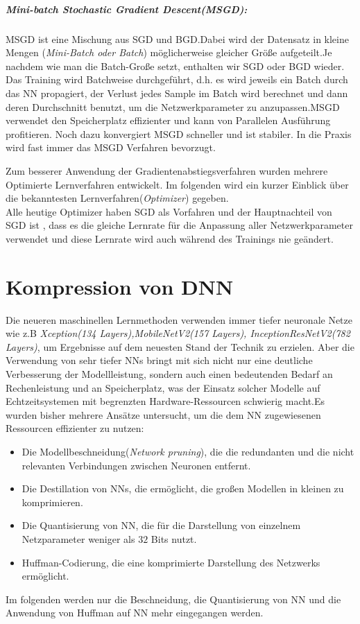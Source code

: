 \documentclass[12pt,a4paper]{scrartcl}
\numberwithin{equation}{section}
\begin{document}
\subparagraph{Mini-batch Stochastic Gradient Descent(MSGD): }
MSGD ist eine Mischung aus SGD und BGD.Dabei wird der Datensatz in kleine Mengen (\textit{Mini-Batch oder Batch}) möglicherweise gleicher Größe aufgeteilt.Je nachdem wie man die Batch-Große setzt, enthalten wir SGD oder BGD wieder. Das Training wird Batchweise durchgeführt, d.h. es wird jeweils ein Batch durch das \ac{NN} propagiert, der Verlust jedes Sample im Batch wird berechnet und dann deren Durchschnitt benutzt, um die Netzwerkparameter zu anzupassen.MSGD verwendet den Speicherplatz effizienter und kann von Parallelen Ausführung profitieren. Noch  dazu konvergiert MSGD schneller und ist stabiler. In die Praxis wird fast immer das MSGD Verfahren bevorzugt.

Zum besserer Anwendung der Gradientenabstiegsverfahren wurden mehrere Optimierte Lernverfahren entwickelt. Im folgenden wird ein kurzer Einblick über die bekanntesten Lernverfahren(\textit{Optimizer})  gegeben.\\
Alle heutige Optimizer haben SGD als Vorfahren und der Hauptnachteil von SGD ist , dass es die gleiche Lernrate für die Anpassung aller Netzwerkparameter verwendet und diese Lernrate wird auch während des Trainings nie geändert. 



\section{Kompression von \ac{DNN}}
Die neueren maschinellen Lernmethoden verwenden immer tiefer neuronale Netze wie z.B \textit{Xception(134 Layers),MobileNetV2(157 Layers), InceptionResNetV2(782 Layers)}, um Ergebnisse auf dem neuesten Stand der Technik zu erzielen. Aber die Verwendung von sehr tiefer \acsp{NN} bringt mit sich nicht nur eine deutliche Verbesserung der Modellleistung, sondern auch einen bedeutenden Bedarf an Rechenleistung und an Speicherplatz, was der Einsatz solcher Modelle auf Echtzeitsystemen mit begrenzten Hardware-Ressourcen schwierig macht.Es wurden bisher mehrere Ansätze untersucht, um die dem \ac{NN} zugewiesenen Ressourcen effizienter zu nutzen:
\begin{itemize}
	\item Die Modellbeschneidung(\textit{Network pruning}), die die redundanten und  die nicht relevanten Verbindungen zwischen Neuronen entfernt.
	 \item Die Destillation von \acsp{NN}, die ermöglicht, die großen Modellen in kleinen  zu komprimieren. 	
 \item Die Quantisierung von \ac{NN}, die für die Darstellung von einzelnem Netzparameter weniger als $ 32 $ Bits nutzt.
 \item  Huffman-Codierung, die eine komprimierte Darstellung des Netzwerks ermöglicht.
\end{itemize} 
Im folgenden werden nur die Beschneidung, die Quantisierung von \ac{NN} und die Anwendung von Huffman auf \ac{NN} mehr eingegangen werden.
\end{document}
